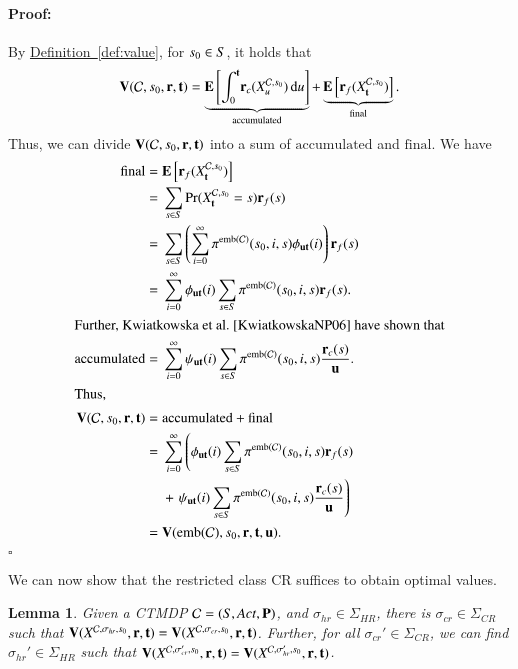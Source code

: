 \documentclass[10pt,twocolumn]{article}
\newenvironment{proof}{\paragraph{Proof:}}{\hfill$\square$}
\newtheorem{lemma}{Lemma}
\DeclareMathOperator{\prob}{Pr}
\newcommand{\states} {{\ensuremath S}}
\newcommand{\state}  {{\ensuremath s}}
\newcommand{\acts}{\mathit{Act}}
\newcommand{\pmat}{\mathbf{P}}
\newcommand{\cmodel}{\mathcal{C}}
\newcommand{\diff}{\mathrm{d}}
\newcommand{\urate}{\mathbf{u}}
\newcommand{\schedshr}{\Sigma_\mathit{HR}}
\newcommand{\schedscr}{\Sigma_\mathit{CR}}
\newcommand{\schedhr}{{\sigma_\mathit{hr}}}
\newcommand{\schedcr}{{\sigma_\mathit{cr}}}
\newcommand{\expect}{\mathbf{E}}
\newcommand{\rew}{\mathbf{r}}
\newcommand{\frew}{\mathbf{r}_f}
\newcommand{\crew}{\mathbf{r}_c}
\newcommand{\timeb}{\mathbf{t}}
\newcommand{\mvalue}{\mathbf{V}}
\newcommand{\emb}{\mathrm{emb}}
\newcommand{\stopro}{X}
\newcommand{\refdef}[1]{\texorpdfstring{\hyperref[def:#1]{Definition~\ref*{def:#1}}}{Definition \ref*{def:#1}}}
\newcommand{\tprob}{\pi}
\begin{document}
\begin{proof}
By \refdef{value}, for $\state_0 \in \states$, it holds that
\begin{equation*}
\mvalue(\cmodel, \state_0, \rew, \timeb) = \underbrace{\expect \left[\int_0^\timeb \! \crew(\stopro_u^{\cmodel,\state_0}) \, \diff u \right]}_{\mathrm{accumulated}} + \underbrace{\expect \left[\frew(\stopro_\timeb^{\cmodel,\state_0}) \right]}_{\mathrm{final}} .
\end{equation*}
Thus, we can divide $\mvalue(\cmodel, \state_0, \rew, \timeb)$ into a sum of $\mathrm{accumulated}$ and $\mathrm{final}$.
We have
{\allowdisplaybreaks\begin{align*}
\mathrm{final} = {} & \expect \left[\frew(\stopro_\timeb^{\cmodel,\state_0}) \right] \\*
= {} & \sum_{\state \in \states} \prob(\stopro_\timeb^{\cmodel,\state_0} = \state) \frew(\state) \\*
= {} & \sum_{\state \in \states} \left(\sum_{i=0}^\infty \tprob^{\emb(\cmodel)}(\state_0, i, \state) \phi_{\urate\timeb}(i)\right) \frew(\state) \\*
= {} & \sum_{i=0}^\infty \phi_{\urate \timeb}(i) \sum_{\state \in \states} \tprob^{\emb(\cmodel)}(\state_0, i, \state) \frew(\state) . \\
\intertext{Further, Kwiatkowska et al.~\cite[Theorem 1]{KwiatkowskaNP06} have shown that}
\mathrm{accumulated} = {} & \sum_{i=0}^\infty \psi_{\urate \timeb}(i) \sum_{\state \in \states} \tprob^{\emb(\cmodel)}(\state_0, i, \state) \frac{\crew(\state)}{\urate} . \\
\intertext{Thus,}
\mvalue(\cmodel, \state_0, \rew, \timeb)  = {} & \mathrm{accumulated} + \mathrm{final}\\*
 = {} & \sum_{i=0}^\infty \left(\phi_{\urate \timeb}(i) \sum_{\state \in \states} \tprob^{\emb(\cmodel)}(\state_0, i, \state) \frew(\state)\right. \\*
  & + \left.\psi_{\urate \timeb}(i) \sum_{\state \in \states} \tprob^{\emb(\cmodel)}(\state_0, i, \state)
  \frac{\crew(\state)}{\urate}\right) \\*
 = {} & \mvalue(\emb(\cmodel), \state_0, \rew, \timeb, \urate) .
\end{align*}}
\end{proof}

We can now show that the restricted class CR suffices to obtain optimal values.
\begin{lemma}
  \label{lem:cr-sameval-hrs}
Given a CTMDP $\cmodel = (\states, \acts, \pmat)$, and $\schedhr \in \schedshr$,
  there is $\schedcr \in \schedscr$ such that
  $\mvalue(\stopro^{\cmodel,\schedhr,\state_0}, \rew, \timeb) = \mvalue(\stopro^{\cmodel,\schedcr,\state_0}, \rew, \timeb)$.
  Further, for all $\sigma_\mathit{cr}' \in \schedscr$, we can find $\sigma_\mathit{hr}' \in \schedshr$ such that
  $\mvalue(\stopro^{\cmodel,\sigma_\mathit{cr}',\state_0}, \rew, \timeb) = \mvalue(\stopro^{\cmodel,\sigma_\mathit{hr}',\state_0}, \rew, \timeb)$.
\end{lemma}
\end{document}
